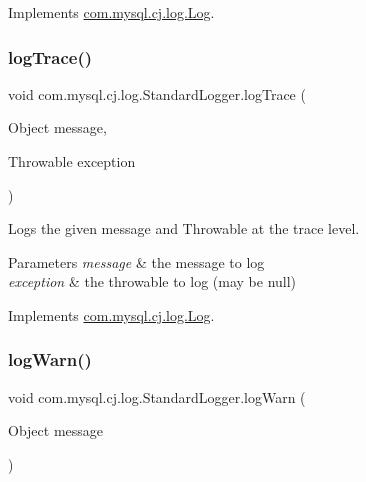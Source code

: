 Implements \mbox{\hyperlink{interfacecom_1_1mysql_1_1cj_1_1log_1_1_log_a04f51d4b9464df28c94695ae8159440e}{com.\+mysql.\+cj.\+log.\+Log}}.

\mbox{\label{classcom_1_1mysql_1_1cj_1_1log_1_1_standard_logger_ae77a38e81b2d0ecb1ccbeafee9294bd3}} 
\subsubsection{\texorpdfstring{log\+Trace()}{logTrace()}\hspace{0.1cm}{\footnotesize\ttfamily [2/2]}}
{\footnotesize\ttfamily void com.\+mysql.\+cj.\+log.\+Standard\+Logger.\+log\+Trace (\begin{DoxyParamCaption}\item[{Object}]{message,  }\item[{Throwable}]{exception }\end{DoxyParamCaption})}

Logs the given message and Throwable at the \textquotesingle{}trace\textquotesingle{} level.


\begin{DoxyParams}{Parameters}
{\em message} & the message to log \\
\hline
{\em exception} & the throwable to log (may be null) \\
\hline
\end{DoxyParams}


Implements \mbox{\hyperlink{interfacecom_1_1mysql_1_1cj_1_1log_1_1_log_aa93fa5550a3152afd64479adca676200}{com.\+mysql.\+cj.\+log.\+Log}}.

\mbox{\label{classcom_1_1mysql_1_1cj_1_1log_1_1_standard_logger_a5197952ca4b6dfe59a54c1aa095717f7}} 
\subsubsection{\texorpdfstring{log\+Warn()}{logWarn()}\hspace{0.1cm}{\footnotesize\ttfamily [1/2]}}
{\footnotesize\ttfamily void com.\+mysql.\+cj.\+log.\+Standard\+Logger.\+log\+Warn (\begin{DoxyParamCaption}\item[{Object}]{message }\end{DoxyParamCaption})}

